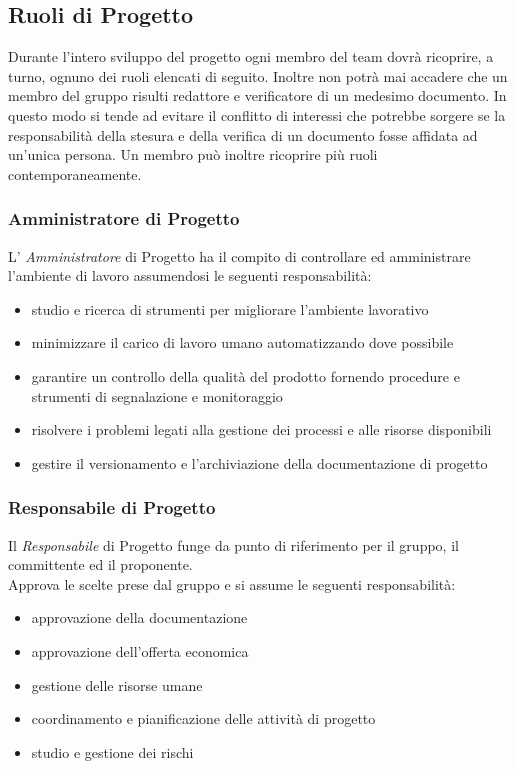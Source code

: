 \subsection{Ruoli di Progetto}

Durante l'intero sviluppo del progetto  ogni membro del team dovrà ricoprire, a
turno, ognuno dei ruoli elencati di seguito.
Inoltre non potrà mai accadere che un membro del gruppo risulti redattore e verificatore di un
medesimo documento. In questo modo si tende ad evitare il conflitto di interessi che potrebbe sorgere se la responsabilità della stesura e della verifica di un documento fosse affidata ad
un'unica persona. Un membro può inoltre ricoprire più ruoli contemporaneamente.

\subsubsection{Amministratore di Progetto} 
L' \emph{Amministratore}  di Progetto ha il compito di controllare ed
amministrare l'ambiente di lavoro assumendosi le seguenti
responsabilità: 
\begin{itemize}
	\item studio e ricerca di strumenti per migliorare l'ambiente lavorativo
	\item minimizzare il carico di lavoro umano automatizzando dove possibile
	\item garantire un controllo della qualità del prodotto fornendo procedure e strumenti di segnalazione e monitoraggio
	\item risolvere i problemi legati alla gestione dei processi e alle risorse disponibili
	\item gestire il versionamento e l'archiviazione della documentazione di progetto
\end{itemize}
\subsubsection{Responsabile  di Progetto}
Il  \emph{Responsabile}  di Progetto funge da punto di riferimento per
il gruppo, il committente ed il proponente.\\ Approva
le scelte prese dal gruppo e si assume le seguenti responsabilità: 
\begin{itemize}
	\item approvazione della documentazione
	\item approvazione dell'offerta economica
	\item gestione delle risorse umane
	\item coordinamento e pianificazione delle attività di progetto
	\item studio e gestione dei rischi
\end{itemize}
